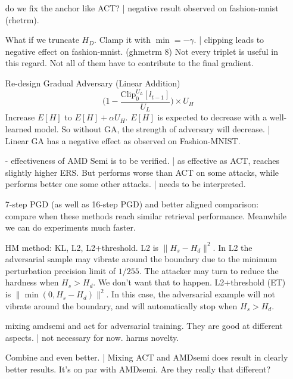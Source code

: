 \begin{enumerate}

	\item [\xmark] do we fix the anchor like ACT? | negative result observed
		on fashion-mnist (rhetrm).

	\item [\xmark] What if we truncate $H_D$. Clamp it with $\min=-\gamma$.
		| clipping leads to negative effect on fashion-mnist. (ghmetrm 8)
		Not every triplet is useful in this regard. Not all of them have to
		contribute to the final gradient.

	\item [\xmark] Re-design Gradual Adversary (Linear Addition)
		\[
			\big(1-\frac{\text{Clip}_0^{U_L}[l_{t-1}]}{U_L} \big)\times U_H
		\]
		Increase $E[H]$ to $E[H]+\alpha U_H$. $E[H]$ is expected to decrease
		with a well-learned model. So without GA, the strength of adversary
		will decrease. | Linear GA has a negative effect as observed on
		Fashion-MNIST.
	
	\item [-] effectiveness of AMD Semi is to be verified. | as effective
		as ACT, reaches slightly higher ERS. But performs worse than ACT on
		some attacks, while performs better one some other attacks. | needs to
		be interpreted.

	\item [\cmark] 7-step PGD (as well as 16-step PGD) and better aligned comparison:
		compare when these methods reach similar retrieval performance.
		Meanwhile we can do experiments much faster.

	\item [\cmark] HM method: KL, L2, L2+threshold. L2 is $\|H_s-H_d\|^2$.
		In L2 the adversarial sample may vibrate around the boundary due to
		the minimum perturbation precision limit of $1/255$. The attacker
		may turn to reduce the hardness when $H_s>H_d$. We don't want that
		to happen.  L2+threshold (ET) is $\|\min(0,H_s-H_d)\|^2$. In this case,
		the adversarial example will not vibrate around the boundary, and will
		automatically stop when $H_s>H_d$.

	\item [\xmark] mixing amdsemi and act for adversarial training. They are good
		at different aspects. | not necessary for now. harms novelty.

	\item [\xmark] Combine and even better. | Mixing ACT and AMDsemi does result
		in clearly better results. It's on par with AMDsemi. Are they really
		that different?


\end{enumerate}
